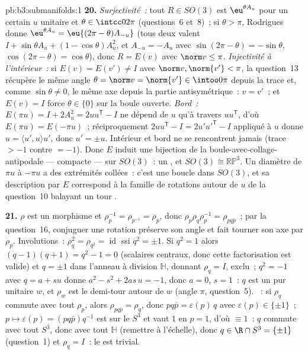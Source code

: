 \begin{solution}{pb:b3:submanifolds:1}
\textbf{20.} \emph{Surjectivité~:} tout $R \in SO(3)$ est
$\eu^{\theta A_u}$ pour un certain $u$ unitaire et $\theta
\in \intcc0{2\pi}$ (questions~6 et~8)~; si $\theta > \pi$,
Rodrigues donne $\eu^{\theta A_u} = \eu{(2\pi -
\theta)A_{-u}}$ (tous deux valent $I + \sin\theta A_u + (1
- \cos\theta)A_u^2$, et $A_{-u} = -A_u$ avec $\sin(2\pi -
\theta) = -\sin\theta$, $\cos(2\pi - \theta) =
\cos\theta$), donc $R = E(v)$ avec $\norm v \leq \pi$.
\emph{Injectivité à l'intérieur~:} si $E(v) = E(v') \neq I$
avec $\norm v, \norm{v'} < \pi$, la question~13 récupère le
même angle $\theta = \norm v = \norm{v'} \in \intoo0\pi$
depuis la trace et, comme $\sin\theta \neq 0$, le même axe
depuis la partie antisymétrique~: $v = v'$~; et $E(v) = I$
force $\theta \in \{0\}$ sur la boule ouverte. \emph{Bord~:}
$E(\pi u) = I + 2A_u^2 = 2uu^{\mathsf T} - I$ ne dépend de
$u$ qu'à travers $uu^{\mathsf T}$, d'où $E(\pi u) =
E(-\pi u)$~; réciproquement $2uu^{\mathsf T} - I =
2u'u'^{\mathsf T} - I$ appliqué à $u$ donne $u = \langle
u', u\rangle u'$, donc $u' = \pm u$. Intérieur et bord ne se
rencontrent jamais (trace $> -1$ contre $= -1$). Donc $E$
induit une bijection  de la
boule-avec-collage-antipodale --- compacte --- sur $SO(3)$~:
un , et $SO(3) \cong \mathbb{RP}^3$. Un
diamètre de $\pi u$ à $-\pi u$ a des extrémités collées~:
c'est une boucle dans $SO(3)$, et sa description par $E$
correspond à la famille de rotations autour de $u$ de la
question~10 balayant un tour .

\textbf{21.} $\rho$ est un morphisme et $\rho_p^{-1} =
\rho_{p^{-1}} = \rho_{\bar p}$, donc
$\rho_p\rho_q\rho_p^{-1} = \rho_{pq\bar p}$~; par la
question~16, conjuguer une rotation préserve son angle et
fait tourner son axe par $\rho_p$. Involutions~: $\rho_q^2
= \rho_{q^2} = \operatorname{id}$ ssi $q^2 = \pm1$. Si $q^2
= 1$ alors $(q - 1)(q + 1) = q^2 - 1 = 0$ (scalaires
centraux, donc cette factorisation est valide) et $q =
\pm1$ dans l'anneau à division $\mathbb H$, donnant
$\rho_q = I$, exclu~; $q^2 = -1$ avec $q = a + su$ donne
$a^2 - s^2 + 2as\,u = -1$, donc $a = 0$, $s = 1$~: $q$ est
un pur unitaire $w$, et $\rho_w$ est le demi-tour autour de
$w$ (angle $\pi$, question~5). ~: si $\rho_q$ commute
avec tout $\rho_p$, alors $\rho_{pq\bar p} = \rho_q$, donc
$pq\bar p = \varepsilon(p)\,q$ avec $\varepsilon(p) \in
\{\pm1\}$~; $p \mapsto \varepsilon(p) = (pq\bar
p)q^{-1}$ est  sur le $S^3$  et vaut $1$ en
$p = 1$, d'où $\equiv 1$~: $q$ commute avec tout $S^3$,
donc avec tout $\mathbb H$ (remettre à l'échelle), donc $q
\in \R \cap S^3 = \{\pm1\}$ (question~1) et $\rho_q = I$~:
le  est trivial.


\end{solution}
